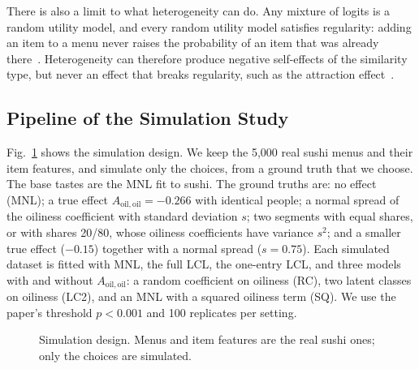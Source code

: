 \documentclass[11pt,journal,a4paper]{IEEEtran}
\newcommand{\Aoo}{A_{\mathrm{oil,oil}}}
\begin{document}
There is also a limit to what heterogeneity can do. Any mixture of logits is a random utility model, and
every random utility model satisfies regularity: adding an item to a menu never raises the probability of an
item that was already there~\cite{bm60}. Heterogeneity can therefore produce negative self-effects of the
similarity type, but never an effect that breaks regularity, such as the attraction effect~\cite{hpp82}.

\subsection{Pipeline of the Simulation Study}

Fig.~\ref{fig:pipeline} shows the simulation design. We keep the 5,000 real sushi menus and their item
features, and simulate only the choices, from a ground truth that we choose. The base tastes are the MNL fit to
sushi. The ground truths are: no effect (MNL); a true effect $\Aoo=-0.266$ with identical people; a normal
spread of the oiliness coefficient with standard deviation $s$; two segments with equal shares, or with
shares 20/80, whose oiliness coefficients have variance $s^2$; and a smaller true effect ($-0.15$) together with
a normal spread ($s=0.75$). Each simulated dataset is fitted with MNL, the full LCL, the one-entry LCL, and
three models with and without $\Aoo$: a random coefficient on oiliness (RC), two latent classes on oiliness
(LC2), and an MNL with a squared oiliness term (SQ). We use the paper's threshold $p<0.001$ and 100
replicates per setting.

\begin{figure}[!t]
\centering
{}
\caption{Simulation design. Menus and item features are the real sushi ones; only the choices are
simulated.}
\label{fig:pipeline}
\end{figure}
\end{document}
